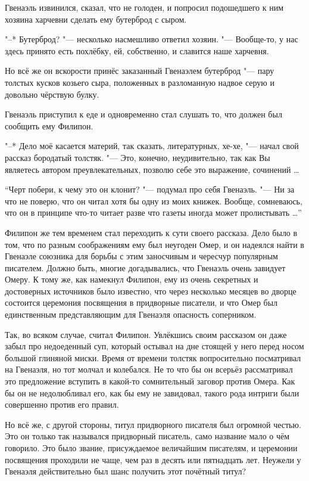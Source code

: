 Гвенаэль извинился, сказал, что не голоден, и попросил подошедшего к ним хозяина
харчевни сделать ему бутерброд с сыром.

"--* Бутерброд? "--- несколько насмешливо ответил хозяин.
"--- Вообще-то, у нас здесь принято есть похлёбку, ей, собственно, и славится
наше харчевня.

Но всё же он вскорости принёс заказанный Гвенаэлем бутерброд "--- пару толстых
кусков козьего сыра, положенных в разломанную надвое серую и довольно чёрствую
булку.

Гвенаэль приступил к еде и одновременно стал слушать то, что должен был сообщить
ему Филипон.

"--* Дело моё касается материй, так сказать, литературных, хе-хе, "--- начал
свой рассказ бородатый толстяк.
"--- Это, конечно, неудивительно, так как Вы являетесь автором преувлекательных,
позволю себе это выражение, сочинений \ldots

\enquote{Черт побери, к чему это он клонит? "--- подумал про себя Гвенаэль.
"--- Ни за что не поверю, что он читал хотя бы одну из моих книжек.
Вообще, сомневаюсь, что он в принципе что-то читает разве что газеты иногда
может пролистывать \ldots}

Филипон же тем временем стал переходить к сути своего рассказа.
Дело было в том, что по разным соображениям ему был неугоден Омер, и он надеялся
найти в Гвенаэле союзника для борьбы с этим заносчивым и чересчур популярным
писателем.
Должно быть, многие догадывались, что Гвенаэль очень завидует Омеру.
К тому же, как намекнул Филипон, ему из очень секретных и достоверных источников
было известно, что через несколько месяцев во дворце состоится церемония
посвящения в придворные писатели, и что Омер был единственным представляющим для
Гвенаэля опасность соперником.

Так, во всяком случае, считал Филипон.
Увлёкшись своим рассказом он даже забыл про недоеденный суп, который остывал на
дне стоящей у него перед носом большой глиняной миски.
Время от времени толстяк вопросительно посматривал на Гвенаэля, но тот молчал и
колебался.
Не то что бы он всерьёз рассматривал это предложение вступить в какой-то
сомнительный заговор против Омера.
Как бы он не недолюбливал его, как бы ему не завидовал, такого рода интриги были
совершенно против его правил.

Но всё же, с другой стороны, титул придворного писателя был огромной честью.
Это он только так назывался придворный писатель, само название мало о чём
говорило.
Это было звание, присуждаемое величайшим писателям, и церемонии посвящения
проходили не чаще, чем раз в десять или пятнадцать лет.
Неужели у Гвенаэля действительно был шанс получить этот почётный титул?

